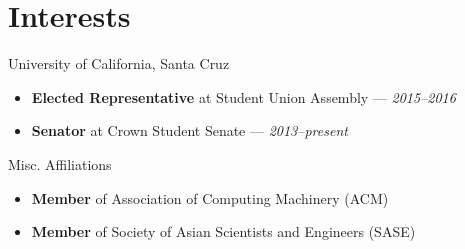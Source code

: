 \documentclass[11pt]{article}
\begin{document}
\section*{Interests}
\begin{description}
   \itemsep0pt \parskip0pt
   \item[Student Government] University of California, Santa Cruz
      \begin{itemize}
         \itemsep0pt \parskip0pt
         \item \textbf{Elected Representative} at Student Union Assembly ---
            \textit{2015--2016}
         \item \textbf{Senator} at Crown Student Senate --- \textit{2013--present}
      \end{itemize}
   \item[Organizations] Misc. Affiliations
      \begin{itemize}
         \item \textbf{Member} of Association of Computing Machinery (ACM)
         \item \textbf{Member} of Society of Asian Scientists and Engineers (SASE)
      \end{itemize}
\end{description}
\end{document}
